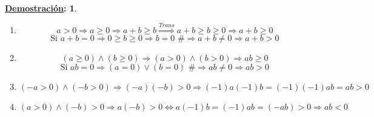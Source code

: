 \documentclass[10pt,a4paper,openright]{book}
\theoremstyle{break}
\newtheorem*{demo}{\underline{Demostración}:}
\begin{document}
\begin{demo}
\begin{enumerate}
\item $$a>0\Rightarrow a\geq 0\Rightarrow a+b\geq b \stackrel{Trans}{\Rightarrow} a+b\geq b\geq 0 \Rightarrow a+b\geq 0$$
$$\mbox{Si } a+b=0 \Rightarrow 0\geq b\geq 0\Rightarrow b=0 \mbox{ \#}\Rightarrow a+b\neq 0 \Rightarrow a+b>0$$
\item $$(a\geq 0) \wedge (b\geq 0)\Rightarrow (a>0) \wedge (b>0) \Rightarrow ab\geq 0$$
$$\mbox{Si }ab=0\Rightarrow (a=0)\vee (b=0)\mbox{ \#}\Rightarrow ab\neq 0 \Rightarrow ab>0$$
\item $$(-a>0)\wedge (-b>0)\Rightarrow (-a)(-b)>0\Rightarrow (-1)a(-1)b=(-1)(-1)ab=ab>0$$
\item $$(a>0)\wedge(-b)>0\Rightarrow a(-b)>0\Leftrightarrow a(-1)b=(-1)ab=(-ab)>0\Rightarrow ab<0$$
\end{enumerate}


\end{demo}
\end{document}
